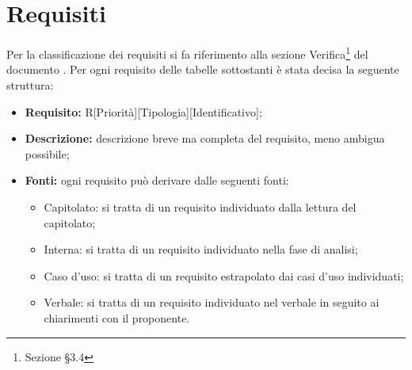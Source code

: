 \section{Requisiti}
Per la classificazione dei requisiti si fa riferimento alla sezione Verifica\footnote{Sezione §3.4} del documento .
Per ogni requisito delle tabelle sottostanti è stata decisa la seguente struttura: 
\begin{itemize}
\item\textbf{Requisito:} R[Priorità][Tipologia][Identificativo];
\item\textbf{Descrizione:} descrizione breve ma completa del requisito, meno ambigua possibile;
\item\textbf{Fonti:} ogni requisito può derivare dalle seguenti fonti:
	\begin{itemize}
		\item Capitolato: si tratta di un requisito individuato dalla lettura del capitolato;
		\item Interna: si tratta di un requisito individuato nella fase di analisi;
		\item Caso d'uso: si tratta di un requisito estrapolato dai casi d'uso individuati;
		\item Verbale: si tratta di un requisito individuato nel verbale in seguito ai chiarimenti con il proponente.
	\end{itemize}
\end{itemize}


